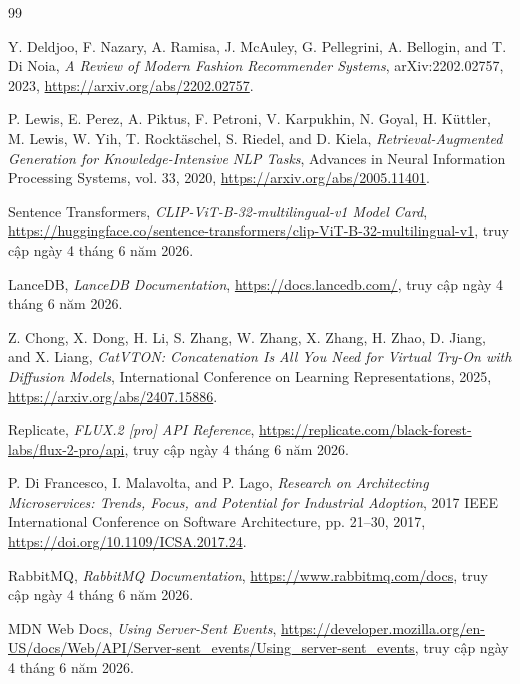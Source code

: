 {}

\begin{thebibliography}{99}
\raggedright

Y. Deldjoo, F. Nazary, A. Ramisa, J. McAuley, G. Pellegrini, A. Bellogin, and T. Di Noia,
\textit{A Review of Modern Fashion Recommender Systems},
arXiv:2202.02757, 2023,
\url{https://arxiv.org/abs/2202.02757}.

P. Lewis, E. Perez, A. Piktus, F. Petroni, V. Karpukhin, N. Goyal, H. K\"uttler, M. Lewis, W. Yih, T. Rockt\"aschel, S. Riedel, and D. Kiela,
\textit{Retrieval-Augmented Generation for Knowledge-Intensive NLP Tasks},
Advances in Neural Information Processing Systems, vol. 33, 2020,
\url{https://arxiv.org/abs/2005.11401}.

Sentence Transformers,
\textit{CLIP-ViT-B-32-multilingual-v1 Model Card},
{\footnotesize\mbox{\url{https://huggingface.co/sentence-transformers/clip-ViT-B-32-multilingual-v1}}},
truy cập ngày 4 tháng 6 năm 2026.

LanceDB,
\textit{LanceDB Documentation},
\url{https://docs.lancedb.com/},
truy cập ngày 4 tháng 6 năm 2026.

Z. Chong, X. Dong, H. Li, S. Zhang, W. Zhang, X. Zhang, H. Zhao, D. Jiang, and X. Liang,
\textit{CatVTON: Concatenation Is All You Need for Virtual Try-On with Diffusion Models},
International Conference on Learning Representations, 2025,
\url{https://arxiv.org/abs/2407.15886}.

Replicate,
\textit{FLUX.2 [pro] API Reference},
\url{https://replicate.com/black-forest-labs/flux-2-pro/api},
truy cập ngày 4 tháng 6 năm 2026.

P. Di Francesco, I. Malavolta, and P. Lago,
\textit{Research on Architecting Microservices: Trends, Focus, and Potential for Industrial Adoption},
2017 IEEE International Conference on Software Architecture, pp. 21--30, 2017,
\url{https://doi.org/10.1109/ICSA.2017.24}.

RabbitMQ,
\textit{RabbitMQ Documentation},
\url{https://www.rabbitmq.com/docs},
truy cập ngày 4 tháng 6 năm 2026.

MDN Web Docs,
\textit{Using Server-Sent Events},
\url{https://developer.mozilla.org/en-US/docs/Web/API/Server-sent_events/Using_server-sent_events},
truy cập ngày 4 tháng 6 năm 2026.


\end{thebibliography}
